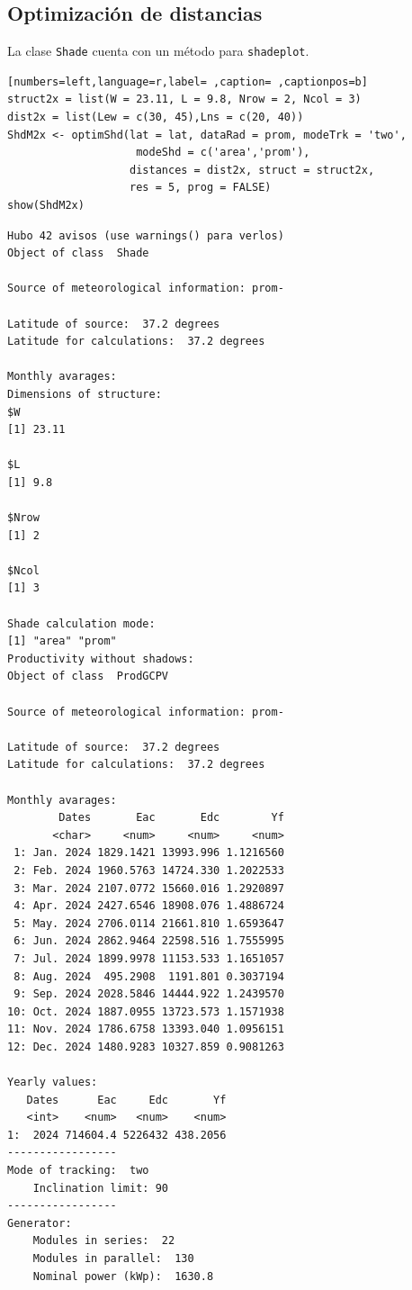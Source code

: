 \subsection{Optimización de distancias}
\label{sec:org3de5909}
La clase \texttt{Shade} cuenta con un método para \texttt{shadeplot}.
\begin{lstlisting}[numbers=left,language=r,label= ,caption= ,captionpos=b]
struct2x = list(W = 23.11, L = 9.8, Nrow = 2, Ncol = 3)
dist2x = list(Lew = c(30, 45),Lns = c(20, 40))
ShdM2x <- optimShd(lat = lat, dataRad = prom, modeTrk = 'two',
                    modeShd = c('area','prom'),
                   distances = dist2x, struct = struct2x,
                   res = 5, prog = FALSE)
show(ShdM2x)
\end{lstlisting}

\begin{verbatim}
Hubo 42 avisos (use warnings() para verlos)
Object of class  Shade 

Source of meteorological information: prom- 

Latitude of source:  37.2 degrees
Latitude for calculations:  37.2 degrees

Monthly avarages:
Dimensions of structure:
$W
[1] 23.11

$L
[1] 9.8

$Nrow
[1] 2

$Ncol
[1] 3

Shade calculation mode:
[1] "area" "prom"
Productivity without shadows:
Object of class  ProdGCPV 

Source of meteorological information: prom- 

Latitude of source:  37.2 degrees
Latitude for calculations:  37.2 degrees

Monthly avarages:
        Dates       Eac       Edc        Yf
       <char>     <num>     <num>     <num>
 1: Jan. 2024 1829.1421 13993.996 1.1216560
 2: Feb. 2024 1960.5763 14724.330 1.2022533
 3: Mar. 2024 2107.0772 15660.016 1.2920897
 4: Apr. 2024 2427.6546 18908.076 1.4886724
 5: May. 2024 2706.0114 21661.810 1.6593647
 6: Jun. 2024 2862.9464 22598.516 1.7555995
 7: Jul. 2024 1899.9978 11153.533 1.1651057
 8: Aug. 2024  495.2908  1191.801 0.3037194
 9: Sep. 2024 2028.5846 14444.922 1.2439570
10: Oct. 2024 1887.0955 13723.573 1.1571938
11: Nov. 2024 1786.6758 13393.040 1.0956151
12: Dec. 2024 1480.9283 10327.859 0.9081263

Yearly values:
   Dates      Eac     Edc       Yf
   <int>    <num>   <num>    <num>
1:  2024 714604.4 5226432 438.2056
-----------------
Mode of tracking:  two 
    Inclination limit: 90 
-----------------
Generator:
    Modules in series:  22 
    Modules in parallel:  130 
    Nominal power (kWp):  1630.8 


\end{verbatim}
